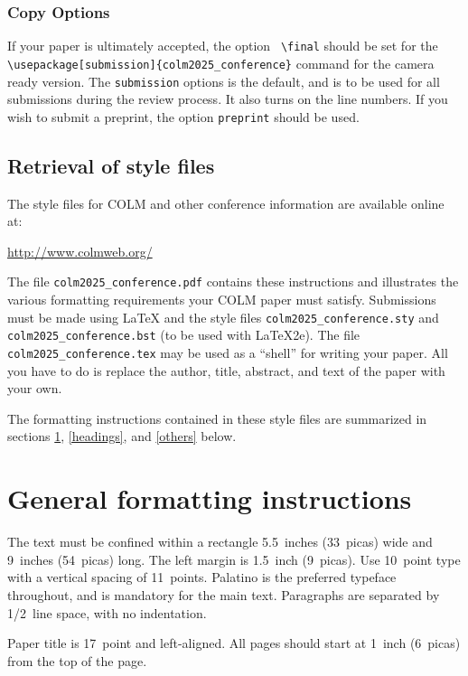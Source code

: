 \documentclass{article} %
\begin{document}
\subsubsection{Copy Options}

If your paper is ultimately accepted, the option {\tt
  {\textbackslash}final} should be set  for the {\tt {\textbackslash}usepackage[submission]\{colm2025\_conference\}} command for the camera ready version. The {\tt submission} options is the default, and is to be used for all submissions during the review process. It also turns on the line numbers. If you wish to submit a preprint, the option {\tt preprint} should be used.
  
  

\subsection{Retrieval of style files}

The style files for COLM and other conference information are available online at:
\begin{center}
   \url{http://www.colmweb.org/}
\end{center}
The file \verb+colm2025_conference.pdf+ contains these
instructions and illustrates the
various formatting requirements your COLM paper must satisfy.
Submissions must be made using \LaTeX{} and the style files
\verb+colm2025_conference.sty+ and \verb+colm2025_conference.bst+ (to be used with \LaTeX{}2e). The file
\verb+colm2025_conference.tex+ may be used as a ``shell'' for writing your paper. All you
have to do is replace the author, title, abstract, and text of the paper with
your own.

The formatting instructions contained in these style files are summarized in
sections \ref{gen_inst}, \ref{headings}, and \ref{others} below.

\section{General formatting instructions}
\label{gen_inst}

The text must be confined within a rectangle 5.5~inches (33~picas) wide and
9~inches (54~picas) long. The left margin is 1.5~inch (9~picas).
Use 10~point type with a vertical spacing of 11~points. Palatino is the
preferred typeface throughout, and is mandatory for the main text. Paragraphs are separated by 1/2~line space, with no indentation. 

Paper title is 17~point and left-aligned.
All pages should start at 1~inch (6~picas) from the top of the page.
\end{document}
